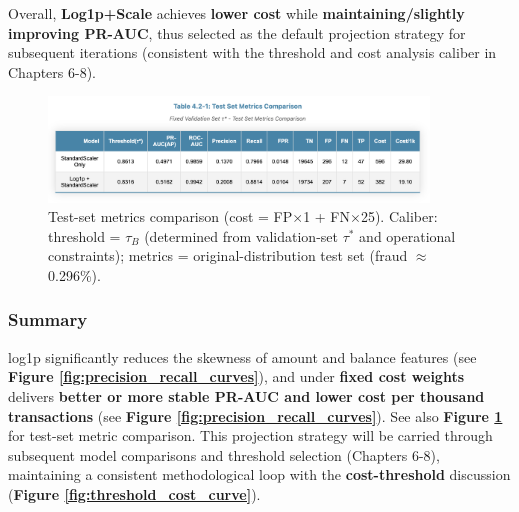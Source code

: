 \documentclass[sigplan,screen]{acmart}
\begin{document}
Overall, \textbf{Log1p+Scale} achieves \textbf{lower cost} while \textbf{maintaining/slightly improving PR-AUC}, thus selected as the default projection strategy for subsequent iterations (consistent with the threshold and cost analysis caliber in Chapters 6-8).

\begin{figure}[h!]
    \centering
    \includegraphics[width=0.9\textwidth]{4.2-1.png}
    \caption{Test-set metrics comparison (cost = FP$\times$1 + FN$\times$25). Caliber: threshold = $\tau_B$ (determined from validation-set $\tau^*$ and operational constraints); metrics = original-distribution test set (fraud $\approx$ 0.296\%).}
    \label{fig:transformation_comparison}
\end{figure}

\subsubsection{Summary}

log1p significantly reduces the skewness of amount and balance features (see \textbf{Figure \ref{fig:precision_recall_curves}}), and under \textbf{fixed cost weights} delivers \textbf{better or more stable PR-AUC and lower cost per thousand transactions} (see \textbf{Figure \ref{fig:precision_recall_curves}}). See also \textbf{Figure \ref{fig:transformation_comparison}} for test-set metric comparison. This projection strategy will be carried through subsequent model comparisons and threshold selection (Chapters 6-8), maintaining a consistent methodological loop with the \textbf{cost-threshold} discussion (\textbf{Figure \ref{fig:threshold_cost_curve}}).
\end{document}

